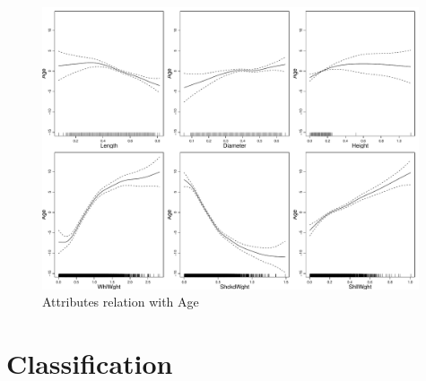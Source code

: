 \documentclass[10pt, paper=a4]{article}
\begin{document}
\begin{figure}[h]
  \centering
  \includegraphics[width = 0.99\textwidth]{gam.pdf}
  \caption{Attributes relation with Age}
  \label{fig:gam}
\end{figure}

\section{Classification}
\label{sec:classification}
\end{document}
